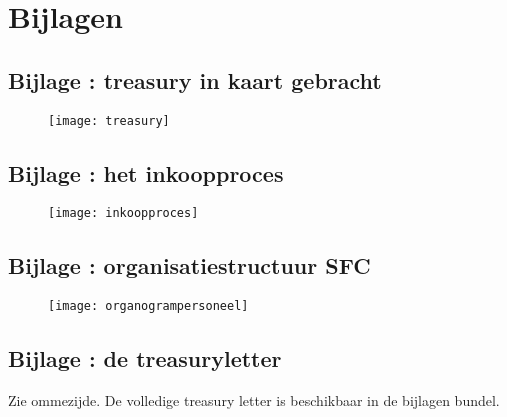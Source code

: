 \newpage
\section*{Bijlagen}

\subsection*{Bijlage \thebijlage: \gls{treasury} in kaart gebracht}
\label{bij:treasury}
\begin{figure}[!hb]
    \centering
    \texttt{[image: treasury]}
    \label{fig:mmtreasury}
\end{figure}

\newpage
{}
\subsection*{\hypertarget{bij:inkoopproces}{Bijlage \thebijlage}: het inkoopproces}
\begin{figure}[!ht]
    \centering
    \texttt{[image: inkoopproces]}
    \label{fig:inkoopproces}
\end{figure}

\newpage
{}
\subsection*{\hypertarget{bij:organisatiepers}{Bijlage \thebijlage}: organisatiestructuur SFC}
\begin{figure}[!ht]
    \centering
    \texttt{[image: organogrampersoneel]}
\end{figure}

\newpage
{}
\subsection*{\hypertarget{bij:treasury}{Bijlage \thebijlage}: de \gls{treasuryletter}}
Zie ommezijde. De volledige treasury letter is beschikbaar in de bijlagen bundel.
\vfill
\begin{center}
\end{center}


